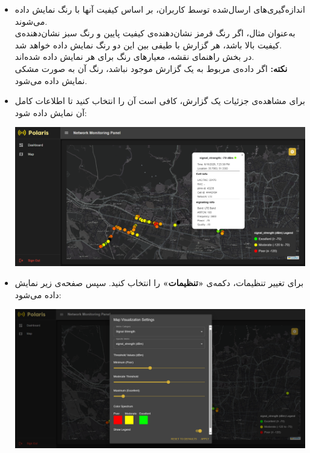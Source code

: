 \begin{itemize}
    \item اندازه‌گیری‌های ارسال‌شده توسط کاربران، بر اساس کیفیت آنها با رنگ نمایش داده می‌شوند.\\
    به‌عنوان مثال، اگر رنگ قرمز نشان‌دهنده‌ی کیفیت پایین و رنگ سبز نشان‌دهنده‌ی کیفیت بالا باشد، هر گزارش با طیفی بین این دو رنگ نمایش داده خواهد شد.\\
    در بخش راهنمای نقشه، معیارهای رنگ برای هر  نمایش داده شده‌اند.\\
    \textbf{نکته:} اگر داده‌ی مربوط به یک گزارش موجود نباشد، رنگ آن به صورت مشکی نمایش داده می‌شود.

    \item برای مشاهده‌ی جزئیات یک گزارش، کافی است آن را انتخاب کنید تا اطلاعات کامل آن نمایش داده شود:
    \begin{center}
        \includegraphics[width=\textwidth]{images/map_popup_open.png}
    \end{center}

    \item برای تغییر تنظیمات، دکمه‌ی \textbf{«تنظیمات»} را انتخاب کنید. سپس صفحه‌ی زیر نمایش داده می‌شود:
    \begin{center}
        \includegraphics[width=\textwidth]{images/settings_overall.png}
    \end{center}


\end{itemize}
